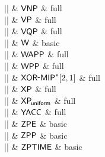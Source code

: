 |\VNP|    & ${\mathsf{VNP}}$ & full \\

|\VP|    & ${\mathsf{VP}}$ & full \\

|\VQP|    & ${\mathsf{VQP}}$ & full \\

|\W|    & ${\mathsf{W}}$ & basic \\

|\WAPP|    & ${\mathsf{WAPP}}$ & full \\

|\WPP|    & ${\mathsf{WPP}}$ & full \\

|\XORMIP|    & $\XORMIP$ & full \\

|\XP|    & ${\mathsf{XP}}$ & full \\

|\XPuniform|    & ${{\mathsf{XP}}_{{\kern-.10em}{\mathsf{uniform}}}}$ & full \\

|\YACC|    & ${\mathsf{YACC}}$ & full \\

|\ZPE|    & ${\mathsf{ZPE}}$ & basic \\

|\ZPP|    & ${\mathsf{ZPP}}$ & basic \\

|\ZPTIME|    & ${\mathsf{ZPTIME}}$ & basic \\
